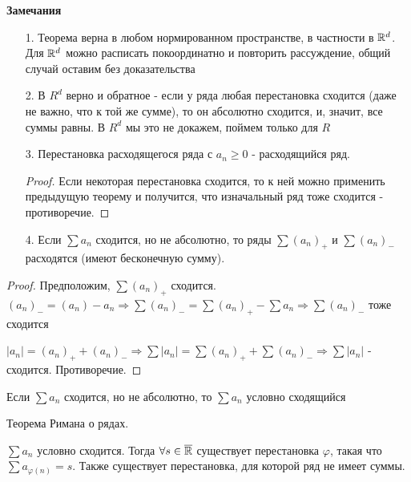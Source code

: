 \textbf{Замечания}
\begin{enumerate}
    \item[1.] Теорема верна в любом нормированном пространстве, в частности в $\mathbb{R}^d$.
    Для $\mathbb{R}^d$ можно расписать покоординатно и повторить рассуждение, общий случай оставим без доказательства
    \item[2.] В $R^d$ верно и обратное - если у ряда любая перестановка сходится (даже не важно, что к той же сумме), то он абсолютно сходится,
    и, значит, все суммы равны. В $R^d$ мы это не докажем, поймем только для $R$
    \item[3.] Перестановка расходящегося ряда с $a_n \geq 0$ - расходящийся ряд.
    \begin{proof}
        Если некоторая перестановка сходится, то к ней можно применить предыдущую теорему и получится, что изначальный ряд тоже сходится - противоречие.
    \end{proof} 
    \item[4.] Если $\sum a_n$ сходится, но не абсолютно, то ряды $\sum (a_n)_+$ и $\sum (a_n)_-$ расходятся (имеют бесконечную сумму).
\end{enumerate}

\begin{proof}
    Предположим, $\sum(a_n)_+$ сходится. $(a_n)_- = (a_n) - a_n \Rightarrow \sum (a_n)_- = \sum (a_n)_+ - \sum a_n \Rightarrow \sum(a_n)_-$ тоже сходится

    $|a_n| = (a_n)_+ + (a_n)_- \Rightarrow \sum |a_n| = \sum(a_n)_+ + \sum(a_n)_- \Rightarrow \sum |a_n|$ - сходится. Противоречие.

\end{proof}

\begin{conj}
    Если $\sum a_n$ сходится, но не абсолютно, то $\sum a_n$ условно сходящийся
\end{conj}

\begin{theorem}
    
    Теорема Римана о рядах.

    $\sum a_n$ условно сходится. Тогда $\forall s \in \overline {\mathbb{R}}$ существует перестановка $\varphi$,
     такая что $\sum a_{\varphi(n)} = s$. Также существует перестановка, для которой ряд не имеет суммы.
\end{theorem}


